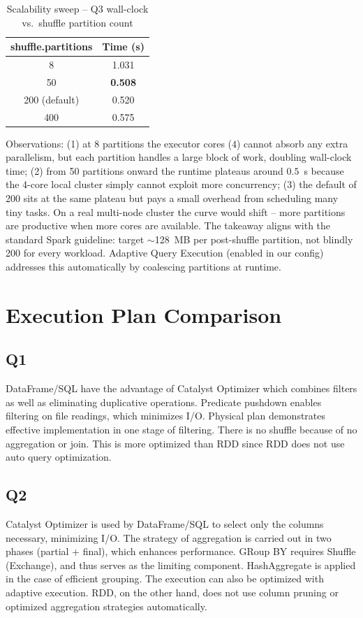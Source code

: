 \documentclass{article}
\begin{document}
\begin{table}[H]
\centering
\caption{Scalability sweep -- Q3 wall-clock vs.\ shuffle partition count}
\begin{tabular}{@{}cc@{}}
\toprule
\textbf{shuffle.partitions} & \textbf{Time (s)} \\
\midrule
8             & 1.031 \\
50            & \textbf{0.508} \\
200 (default) & 0.520 \\
400           & 0.575 \\
\bottomrule
\end{tabular}
\end{table}

Observations: (1) at 8 partitions the executor cores ($4$) cannot absorb any extra parallelism, but each partition handles a large block of work, doubling wall-clock time; (2) from 50 partitions onward the runtime plateaus around $0.5$~s because the 4-core local cluster simply cannot exploit more concurrency; (3) the default of 200 sits at the same plateau but pays a small overhead from scheduling many tiny tasks. On a real multi-node cluster the curve would shift -- more partitions are productive when more cores are available. The takeaway aligns with the standard Spark guideline: target $\sim$128~MB per post-shuffle partition, not blindly 200 for every workload. Adaptive Query Execution (enabled in our config) addresses this automatically by coalescing partitions at runtime.

\section{Execution Plan Comparison}
\subsection{Q1}
DataFrame/SQL have the advantage of Catalyst Optimizer which combines filters as well as eliminating duplicative operations.
Predicate pushdown enables filtering on file readings, which minimizes I/O.
Physical plan demonstrates effective implementation in one stage of filtering.
There is no shuffle because of no aggregation or join.
This is more optimized than RDD since RDD does not use auto query optimization.
\subsection{Q2}
Catalyst Optimizer is used by DataFrame/SQL to select only the columns necessary, minimizing I/O.
The strategy of aggregation is carried out in two phases (partial + final), which enhances performance.
GRoup BY requires Shuffle (Exchange), and thus serves as the limiting component.
HashAggregate is applied in the case of efficient grouping.
The execution can also be optimized with adaptive execution.
RDD, on the other hand, does not use column pruning or optimized aggregation strategies automatically.
\end{document}
